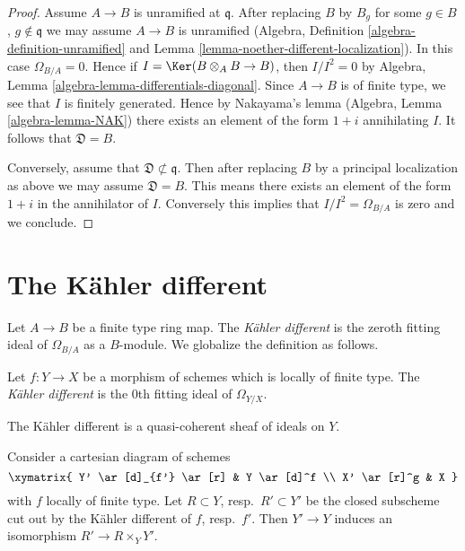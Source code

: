 \begin{proof}
Assume $A \to B$ is unramified at $\mathfrak q$. After replacing
$B$ by $B_g$ for some $g \in B$, $g \not \in \mathfrak q$ we may
assume $A \to B$ is unramified (Algebra, Definition
\ref{algebra-definition-unramified} and
Lemma \ref{lemma-noether-different-localization}).
In this case $\Omega_{B/A} = 0$. Hence if $I = \Ker(B \otimes_A B \to B)$,
then $I/I^2 = 0$ by
Algebra, Lemma \ref{algebra-lemma-differentials-diagonal}.
Since $A \to B$ is of finite type, we see that $I$ is finitely
generated. Hence by Nakayama's lemma
(Algebra, Lemma \ref{algebra-lemma-NAK})
there exists an element of the form $1 + i$
annihilating $I$. It follows that $\mathfrak{D} = B$.

\medskip\noindent
Conversely, assume that $\mathfrak{D} \not \subset \mathfrak q$.
Then after replacing $B$ by a principal localization as above
we may assume $\mathfrak{D} = B$. This means there exists an
element of the form $1 + i$ in the annihilator of $I$.
Conversely this implies that $I/I^2 = \Omega_{B/A}$ is zero
and we conclude.
\end{proof}







\section{The K\"ahler different}
\label{section-kahler-different}

\noindent
Let $A \to B$ be a finite type ring map. The {\it K\"ahler different} is the
zeroth fitting ideal of $\Omega_{B/A}$ as a $B$-module. We globalize the
definition as follows.

\begin{definition}
\label{definition-kahler-different}
Let $f : Y \to X$ be a morphism of schemes which is locally of finite type.
The {\it K\"ahler different} is the $0$th fitting ideal of $\Omega_{Y/X}$.
\end{definition}

\noindent
The K\"ahler different is a quasi-coherent sheaf of ideals on $Y$.

\begin{lemma}
\label{lemma-base-change-kahler-different}
Consider a cartesian diagram of schemes
$$
\xymatrix{
Y' \ar[d]_{f'} \ar[r] & Y \ar[d]^f \\
X' \ar[r]^g & X
}
$$
with $f$ locally of finite type. Let $R \subset Y$, resp.\ $R' \subset Y'$
be the closed subscheme cut out by the K\"ahler different of $f$, resp.\ $f'$.
Then $Y' \to Y$ induces an isomorphism $R' \to R \times_Y Y'$.
\end{lemma}

